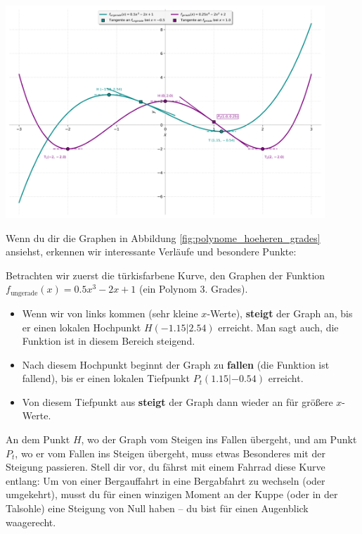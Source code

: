 \begin{center} %
    \includegraphics[width=0.9\textwidth]{grafiken/Polynome_Gerade_Ungerade.png}
    \label{fig:polynome_hoeheren_grades}
\end{center}

Wenn du dir die Graphen in Abbildung \ref{fig:polynome_hoeheren_grades} ansiehst, erkennen wir interessante Verläufe und besondere Punkte:

Betrachten wir zuerst die türkisfarbene Kurve, den Graphen der Funktion \textbf{$f_{\text{ungerade}}(x) = 0.5x^3 - 2x + 1$} (ein Polynom 3. Grades).
\begin{itemize}
    \item Wenn wir von links kommen (sehr kleine $x$-Werte), \textbf{steigt} der Graph an, bis er einen lokalen Hochpunkt $H(-1.15 | 2.54)$ erreicht. Man sagt auch, die Funktion ist in diesem Bereich steigend.
    \item Nach diesem Hochpunkt beginnt der Graph zu \textbf{fallen} (die Funktion ist fallend), bis er einen lokalen Tiefpunkt $P_t(1.15 | -0.54)$ erreicht.
    \item Von diesem Tiefpunkt aus \textbf{steigt} der Graph dann wieder an für größere $x$-Werte.
\end{itemize}
An dem Punkt $H$, wo der Graph vom Steigen ins Fallen übergeht, und am Punkt $P_t$, wo er vom Fallen ins Steigen übergeht, muss etwas Besonderes mit der Steigung passieren. Stell dir vor, du fährst mit einem Fahrrad diese Kurve entlang: Um von einer Bergauffahrt in eine Bergabfahrt zu wechseln (oder umgekehrt), musst du für einen winzigen Moment an der Kuppe (oder in der Talsohle) eine Steigung von Null haben – du bist für einen Augenblick waagerecht.\\

